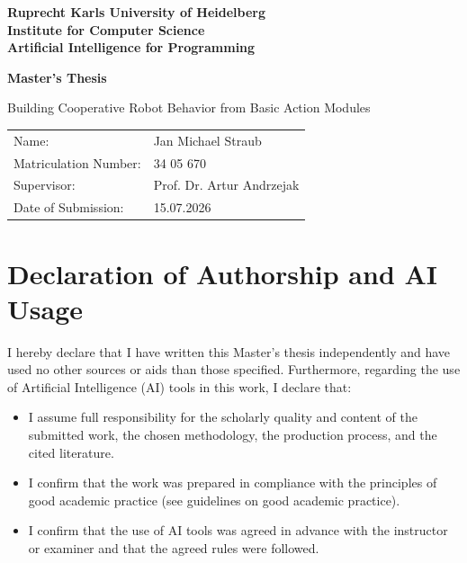 \documentclass[
     12pt,
     a4paper,
     BCOR=10mm,
     DIV=14,
     listof=totoc,
     bibliography=totoc,
     parskip,
     twoside,
     headsepline
     ]{scrreprt}
\begin{document}
\begin{titlepage}

	\vspace*{1cm}
	\begin{center}
		\vspace*{1cm}
		\textbf{
			\Large Ruprecht Karls University of Heidelberg\\
			\smallskip
			\Large Institute for Computer Science\\
			\smallskip
			\Large Artificial Intelligence for Programming\\
			\smallskip
		}

		\vspace{3cm}

		\textbf{\large Master's Thesis} %

		\vspace{2\baselineskip}
		{\huge
			Building Cooperative Robot Behavior from Basic Action Modules
		}
	\end{center}

	\vfill

	{\large
		\begin{tabular}[l]{ll}
			Name:                 & Jan Michael Straub        \\
			Matriculation Number: & 34 05 670                 \\
			Supervisor:           & Prof. Dr. Artur Andrzejak \\
			Date of Submission:   & 15.07.2026
		\end{tabular}
	}

\end{titlepage}

\onehalfspacing

\thispagestyle{empty}

\vspace*{30pt}

\section*{Declaration of Authorship and AI Usage}

I hereby declare that I have written this Master's thesis independently and have used no other sources or aids than those specified. Furthermore, regarding the use of Artificial Intelligence (AI) tools in this work, I declare that:

\begin{itemize}
	\item I assume full responsibility for the scholarly quality and content of the submitted work, the chosen methodology, the production process, and the cited literature.
	\item I confirm that the work was prepared in compliance with the principles of good academic practice (see guidelines on good academic practice).
	\item I confirm that the use of AI tools was agreed in advance with the instructor or examiner and that the agreed rules were followed.
\end{itemize}
\end{document}
